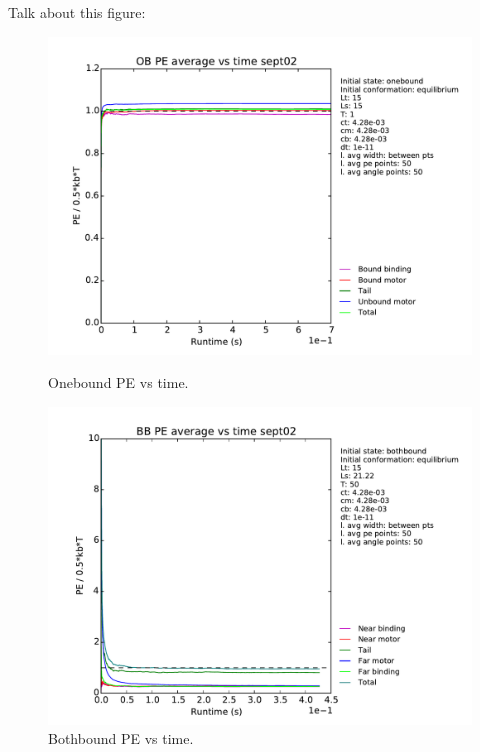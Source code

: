\documentclass[10pt]{article} %
\begin{document}
Talk about this figure:

\begin{figure}[h!]
  \centering
  \begin{minipage}[b]{0.49\textwidth}
    \includegraphics[width=\textwidth]{../figures/OB_Average_PE.pdf}
    \caption{Onebound PE vs time.}
  \end{minipage}
  \begin{minipage}[b]{0.49\textwidth}
    \includegraphics[width=\textwidth]{../figures/BB_Average_PE.pdf}
    \caption{Bothbound PE vs time.}
  \end{minipage}
  \label{fig:equipartition_agreement}
\end{figure}
\end{document}
